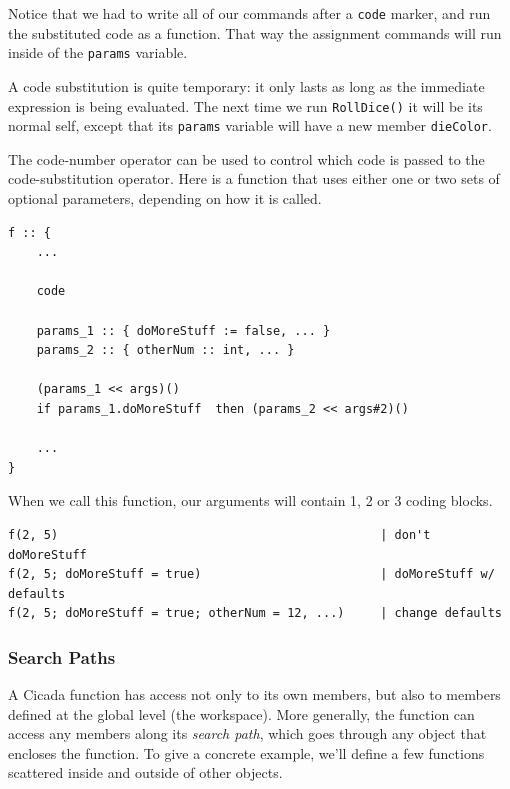 \documentclass{article}
\newenvironment{code}{
       \begin{list}{}{
               \setlength{\leftmargin}{.4in}
               \setlength{\rightmargin}{0in}
               \setlength{\topsep}{.2in}
       }
       \small
       \item[] }
       { \end{list}   }
\begin{document}
\noindent Notice that we had to write all of our commands after a \texttt{code} marker, and run the substituted code as a function.  That way the assignment commands will run inside of the \verb#params# variable.

A code substitution is quite temporary:  it only lasts as long as the immediate expression is being evaluated.  The next time we run \verb#RollDice()# it will be its normal self, except that its \verb#params# variable will have a new member \verb#dieColor#.

The code-number operator can be used to control which code is passed to the code-substitution operator.  Here is a function that uses either one or two sets of optional parameters, depending on how it is called.

\begin{code} \begin{verbatim}
f :: {
    ...
    
    code
    
    params_1 :: { doMoreStuff := false, ... }
    params_2 :: { otherNum :: int, ... }
    
    (params_1 << args)()
    if params_1.doMoreStuff  then (params_2 << args#2)()
    
    ...
}
\end{verbatim} \end{code}

\noindent When we call this function, our arguments will contain 1, 2 or 3 coding blocks.

\begin{code} \begin{verbatim}
f(2, 5)                                             | don't doMoreStuff
f(2, 5; doMoreStuff = true)                         | doMoreStuff w/ defaults
f(2, 5; doMoreStuff = true; otherNum = 12, ...)     | change defaults
\end{verbatim} \end{code}






\subsubsection{Search Paths} 

A Cicada function has access not only to its own members, but also to members defined at the global level (the workspace).  More generally, the function can access any members along its \emph{search path}, which goes through any object that encloses the function.  To give a concrete example, we'll define a few functions scattered inside and outside of other objects.
\end{document}
